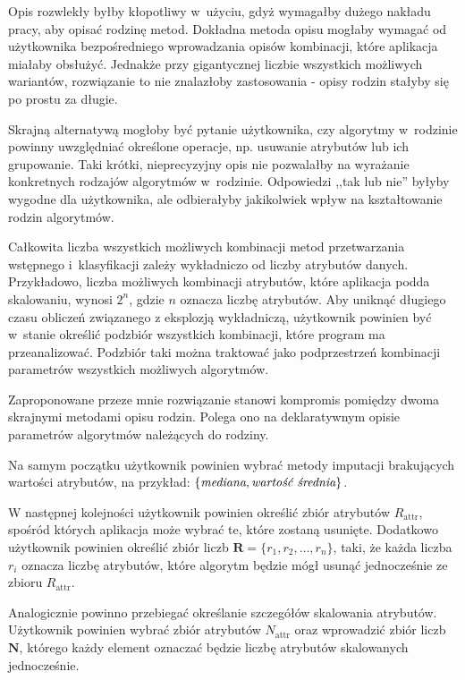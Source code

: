 \documentclass[../thesis.tex]{subfiles}
\begin{document}
Opis rozwlekły byłby kłopotliwy w~użyciu, gdyż wymagałby dużego nakładu pracy, aby opisać rodzinę metod. Dokładna metoda opisu mogłaby wymagać od użytkownika bezpośredniego wprowadzania opisów kombinacji, które aplikacja miałaby obsłużyć. Jednakże przy gigantycznej liczbie wszystkich możliwych wariantów, rozwiązanie to nie znalazłoby zastosowania - opisy rodzin stałyby się po prostu za długie. 

Skrajną alternatywą mogłoby być pytanie użytkownika, czy algorytmy w~rodzinie powinny uwzględniać określone operacje, np. usuwanie atrybutów lub ich grupowanie. Taki krótki, nieprecyzyjny opis nie pozwalałby na wyrażanie konkretnych rodzajów algorytmów w~rodzinie.  Odpowiedzi ,,tak lub nie'' byłyby wygodne dla użytkownika, ale odbierałyby jakikolwiek wpływ na kształtowanie rodzin algorytmów.

Całkowita liczba wszystkich możliwych kombinacji metod przetwarzania wstępnego i~klasyfikacji zależy wykładniczo od liczby atrybutów danych. Przykładowo, liczba możliwych kombinacji atrybutów, które aplikacja podda skalowaniu, wynosi $2^{n}$, gdzie $n$ oznacza liczbę atrybutów. Aby uniknąć długiego czasu obliczeń związanego z eksplozją wykładniczą, użytkownik powinien być w~stanie określić podzbiór wszystkich kombinacji, które program ma przeanalizować. Podzbiór taki można traktować jako podprzestrzeń kombinacji parametrów wszystkich możliwych algorytmów.

Zaproponowane przeze mnie rozwiązanie stanowi kompromis pomiędzy dwoma skrajnymi metodami opisu rodzin. Polega ono na deklaratywnym opisie parametrów algorytmów należących do rodziny. 

Na samym początku użytkownik powinien wybrać metody imputacji brakujących wartości atrybutów, na przykład: $\{\emph{mediana}, \emph{wartość średnia}\}$.

W następnej kolejności użytkownik powinien określić zbiór atrybutów $R_\textrm{attr}$, spośród których aplikacja może wybrać te, które zostaną usunięte. Dodatkowo użytkownik powinien określić zbiór liczb $\textbf{R} = \{r_1, r_2, \ldots, r_n\}$, taki, że każda liczba $r_i$ oznacza liczbę atrybutów, które algorytm będzie mógł usunąć jednocześnie ze zbioru $R_\textrm{attr}$.

Analogicznie powinno przebiegać określanie szczegółów skalowania atrybutów. Użytkownik powinien wybrać zbiór atrybutów $N_\textrm{attr}$ oraz wprowadzić zbiór liczb $\textbf{N}$, którego każdy element oznaczać będzie liczbę atrybutów skalowanych jednocześnie.
\end{document}
